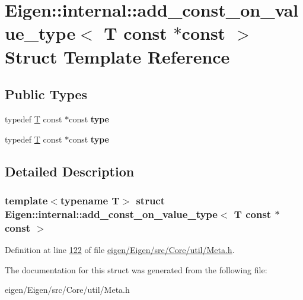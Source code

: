 \hypertarget{struct_eigen_1_1internal_1_1add__const__on__value__type_3_01_t_01const_01_5const_01_4}{}\section{Eigen\+:\+:internal\+:\+:add\+\_\+const\+\_\+on\+\_\+value\+\_\+type$<$ T const $\ast$const $>$ Struct Template Reference}
\label{struct_eigen_1_1internal_1_1add__const__on__value__type_3_01_t_01const_01_5const_01_4}
\subsection*{Public Types}
\begin{DoxyCompactItemize}
\item 
\mbox{\label{struct_eigen_1_1internal_1_1add__const__on__value__type_3_01_t_01const_01_5const_01_4_a66b342b16d4c3ea451460b1ca97f968f}} 
typedef \hyperlink{group___sparse_core___module}{T} const  $\ast$const {\bfseries type}
\item 
\mbox{\label{struct_eigen_1_1internal_1_1add__const__on__value__type_3_01_t_01const_01_5const_01_4_a66b342b16d4c3ea451460b1ca97f968f}} 
typedef \hyperlink{group___sparse_core___module}{T} const  $\ast$const {\bfseries type}
\end{DoxyCompactItemize}


\subsection{Detailed Description}
\subsubsection*{template$<$typename T$>$\newline
struct Eigen\+::internal\+::add\+\_\+const\+\_\+on\+\_\+value\+\_\+type$<$ T const $\ast$const $>$}



Definition at line \hyperlink{eigen_2_eigen_2src_2_core_2util_2_meta_8h_source_l00122}{122} of file \hyperlink{eigen_2_eigen_2src_2_core_2util_2_meta_8h_source}{eigen/\+Eigen/src/\+Core/util/\+Meta.\+h}.



The documentation for this struct was generated from the following file\+:\begin{DoxyCompactItemize}
\item 
eigen/\+Eigen/src/\+Core/util/\+Meta.\+h\end{DoxyCompactItemize}
